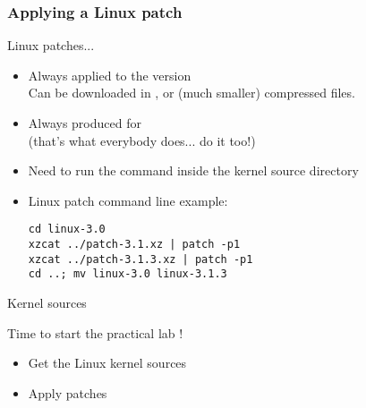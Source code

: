\begin{frame}[fragile]
  \frametitle{Applying a Linux patch}
  Linux patches...
  \begin{itemize}
  \item Always applied to the  version\\
    Can be downloaded in ,  or  (much
    smaller) compressed files.
  \item Always produced for \\
    (that's what everybody does... do it too!)
  \item Need to run the  command inside the kernel source
    directory
  \item Linux patch command line example:\\
\begin{verbatim}
cd linux-3.0
xzcat ../patch-3.1.xz | patch -p1
xzcat ../patch-3.1.3.xz | patch -p1
cd ..; mv linux-3.0 linux-3.1.3
\end{verbatim}
  \end{itemize}
\end{frame}

\setuplabframe
{Kernel sources}
{
  Time to start the practical lab !
  \begin{itemize}
  \item Get the Linux kernel sources
  \item Apply patches
  \end{itemize}
}
